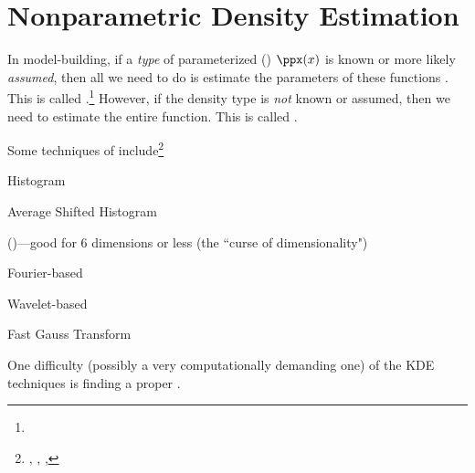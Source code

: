 \chapter{Nonparametric Density Estimation}
\label{chp:pdfest}
In model-building, if a \emph{type} of parameterized
 () $\ppx(x)$ 
is known or more likely \emph{assumed}, 
then all we need to do is estimate the parameters of these functions .
This is called .\footnote{
  }
However, if the density type is \emph{not} known or assumed, then we need to estimate 
the entire function.
This is called .

Some techniques of  include\footnote{
  ,
  ,
  ,
  }
\begin{listi}
  \item Histogram %
  \item Average Shifted Histogram
  \item {} ()---good for 6 dimensions or less
        (the ``curse of dimensionality"\footnotemark)
  \item Fourier-based
  \item Wavelet-based
  \item Fast Gauss Transform
\end{listi}

One difficulty (possibly a very computationally demanding one) 
of the KDE techniques is finding a proper .

